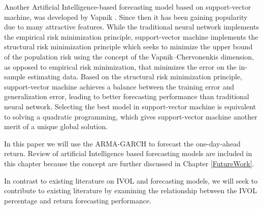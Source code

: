 Another Artificial Intelligence-based forecasting model based on support-vector machine, was developed by Vapnik \cite{Vapnik1}\cite{Vapnik2}. Since then it has been gaining popularity due to many attractive features. While the traditional neural network implements the empirical risk minimization principle, support-vector machine implements the structural risk minimization principle which seeks to minimize the upper bound of the population risk using the concept of the Vapnik–Chervonenkis dimension, as opposed to empirical risk minimization, that minimizes the error on the in-sample estimating data. Based on the structural risk minimization principle, support-vector machine achieves a balance between the training error and generalization error, leading to better forecasting performance than traditional neural network. Selecting the best model in support-vector machine is equivalent to solving a quadratic programming, which gives support-vector machine another merit of a unique global solution. 

In this paper we will use the ARMA-GARCH to forecast the one-day-ahead return. Review of artificial Intelligence based forecasting models are included in this chapter because the concept are further discussed in Chapter \ref{FutureWork}.

In contrast to existing literature on IVOL and forecasting models, we will seek to contribute to existing literature by examining the relationship between the IVOL percentage and return forecasting performance. 

